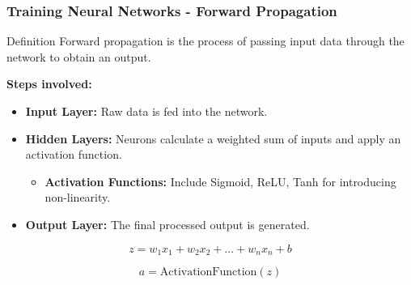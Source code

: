 \documentclass[aspectratio=169]{beamer}
\begin{document}
\begin{frame}[fragile]
    \frametitle{Training Neural Networks - Forward Propagation}

    \begin{block}{Definition}
        Forward propagation is the process of passing input data through the network to obtain an output.
    \end{block}

    \textbf{Steps involved:}
    \begin{itemize}
        \item \textbf{Input Layer:} Raw data is fed into the network.
        \item \textbf{Hidden Layers:} Neurons calculate a weighted sum of inputs and apply an activation function.
        \begin{itemize}
            \item \textbf{Activation Functions:} Include Sigmoid, ReLU, Tanh for introducing non-linearity.
        \end{itemize}
        \item \textbf{Output Layer:} The final processed output is generated.
    \end{itemize}

    \begin{equation}
        z = w_1x_1 + w_2x_2 + ... + w_nx_n + b
    \end{equation}
    
    \begin{equation}
        a = \text{ActivationFunction}(z)
    \end{equation}
\end{frame}
\end{document}
